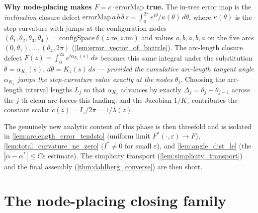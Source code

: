 \medskip\noindent\textbf{Why node-placing makes $F=c\cdot\mathrm{errorMap}$ true.}
The in-tree error map is the \emph{inclination} closure defect
$\mathrm{errorMap}\,a\,b\,\delta\,z=\int_0^{2\pi}e^{i\theta}/\kappa(\theta)\,d\theta$,
where $\kappa(\theta)$ is the step curvature with jumps at the configuration nodes
$(\theta_1,\theta_2,\theta_3,\theta_4)=\mathrm{configSpace}\,\delta\,(z.\mathrm{re},z.\mathrm{im})$
and values $a,b,a,b,a$ on the five arcs $(0,\theta_1),\dots,(\theta_4,2\pi)$
(\cref{lem:error_vector_of_bicircle}). The arc-length closure defect
$F(z)=\int_0^{2\pi}e^{i\alpha_{K_z}(s)}\,ds$ becomes this same integral under the
substitution $\theta=\alpha_{K_z}(s)$, $d\theta=K_z(s)\,ds$ --- \emph{provided the
cumulative arc-length tangent angle $\alpha_{K_z}$ jumps the step-curvature value
exactly at the nodes $\theta_j$}. Choosing the arc-length interval lengths $L_j$ so
that $\alpha_{K_z}$ advances by exactly $\Delta_j=\theta_j-\theta_{j-1}$ across the
$j$-th clean arc forces this landing, and the Jacobian $1/K_z$ contributes the
constant scalar $c(z)=I_z/2\pi=1/\lambda(z)$.

\medskip
The genuinely new analytic content of this phase is then threefold and is isolated
in \cref{lem:arclength_error_tendsto} (uniform limit
$F^*(\cdot,\varepsilon)\to F$), \cref{lem:total_curvature_ne_zero}
($I^*\neq 0$ for small $\varepsilon$), and \cref{lem:angle_dist_le} (the
$|\alpha-\alpha^*|\le C\varepsilon$ estimate). The simplicity transport
(\cref{lem:simplicity_transport}) and the final assembly
(\cref{thm:dahlberg_converse}) are then short.

\section{The node-placing closing family}


